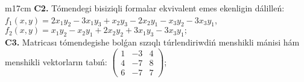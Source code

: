 \documentclass{article}
\begin{document}
\begin{tabular}{m{17cm}}
\textbf{C2.} Tómendegi bisiziqli formalar ekvivalent emes ekenligin dálilleń:\(f_{1}(x,y) = 2x_{1}y_{2} - 3x_{1}y_{3} + x_{2}y_{3} - 2x_{2}y_{1} - x_{3}y_{2} - 3x_{3}y_{1}\),\(f_{2}(x,y) = x_{1}y_{2} - x_{2}y_{1} + 2x_{2}y_{2} + 3x_{1}y_{3} - 3x_{3}y_{1};\) \\
\textbf{C3.} Matricası tómendegishe bolǵan sızıqlı túrlendiriwdiń menshikli mánisi hám menshikli vektorların tabıń: \(\begin{pmatrix} 1 & - 3 & 4 \\ 4 & - 7 & 8 \\ 6 & - 7 & 7 \end{pmatrix}\); \\

\end{tabular}
\vspace{1cm}
\end{document}
